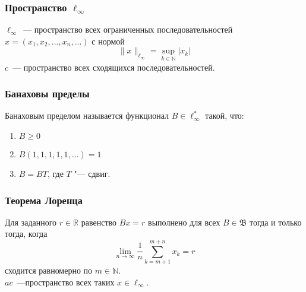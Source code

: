 \par
\begin{varwidth}[t]{0.3\linewidth}
	\frametitle{Пространство $\ell_\infty$}
	$\ell_\infty$~--- пространство всех ограниченных последовательностей
	$x=(x_1, x_2, ..., x_n, ...)$
	с нормой
	$$
		\|x\|_{\ell_\infty} = \sup_{k\in\mathbb{N}} |x_k|
	$$
	$c$~--- пространство всех сходящихся последовательностей.
\end{varwidth}
\hfill
\begin{varwidth}[t]{0.25\linewidth}
	\frametitle{Банаховы пределы}
	Банаховым пределом называется функционал $B\in \ell_\infty^*$ такой, что:
	\begin{enumerate}
		\item
			$B \geqslant 0$
		\item
			$B(1,1,1,1,1,...) = 1$
		\item
			$B=BT$, где $T$ "--- сдвиг.
	\end{enumerate}
\end{varwidth}
\hfill
\begin{varwidth}[t]{0.35\linewidth}
\frametitle{Теорема Лоренца}
	Для заданного $r\in\mathbb{R}$ равенство $Bx=r$ выполнено для всех $B\in\mathfrak{B}$
	тогда и только тогда, когда
	\begin{equation*}
		\lim_{n\to\infty} \frac{1}{n} \sum_{k=m+1}^{m+n} x_k = r
	\end{equation*}
	сходится равномерно по $m\in\mathbb{N}$.
	\\
	$ac$~---пространство всех таких $x \in \ell_\infty$.
\end{varwidth}
\par
\vfill
